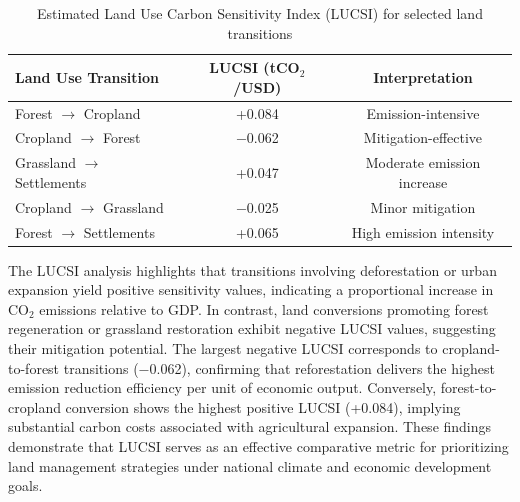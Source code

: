 \documentclass[10pt,letterpaper]{article}
\begin{document}
\begin{table}[H]
	\centering
	\caption{Estimated Land Use Carbon Sensitivity Index (LUCSI) for selected land transitions}
	\label{tab:lucsivalues}
	\begin{tabular}{lcc}
		\hline
		\textbf{Land Use Transition} & \textbf{LUCSI (tCO$_2$/USD)} & \textbf{Interpretation} \\
		\hline
		Forest $\rightarrow$ Cropland & +0.084 & Emission-intensive \\
		Cropland $\rightarrow$ Forest & $-$0.062 & Mitigation-effective \\
		Grassland $\rightarrow$ Settlements & +0.047 & Moderate emission increase \\
		Cropland $\rightarrow$ Grassland & $-$0.025 & Minor mitigation \\
		Forest $\rightarrow$ Settlements & +0.065 & High emission intensity \\
		\hline
	\end{tabular}
\end{table}

The LUCSI analysis highlights that transitions involving deforestation or urban expansion yield positive sensitivity values, indicating a proportional increase in CO$_2$ emissions relative to GDP. In contrast, land conversions promoting forest regeneration or grassland restoration exhibit negative LUCSI values, suggesting their mitigation potential. The largest negative LUCSI corresponds to cropland-to-forest transitions ($-$0.062), confirming that reforestation delivers the highest emission reduction efficiency per unit of economic output. Conversely, forest-to-cropland conversion shows the highest positive LUCSI (+0.084), implying substantial carbon costs associated with agricultural expansion. These findings demonstrate that LUCSI serves as an effective comparative metric for prioritizing land management strategies under national climate and economic development goals.
\end{document}
